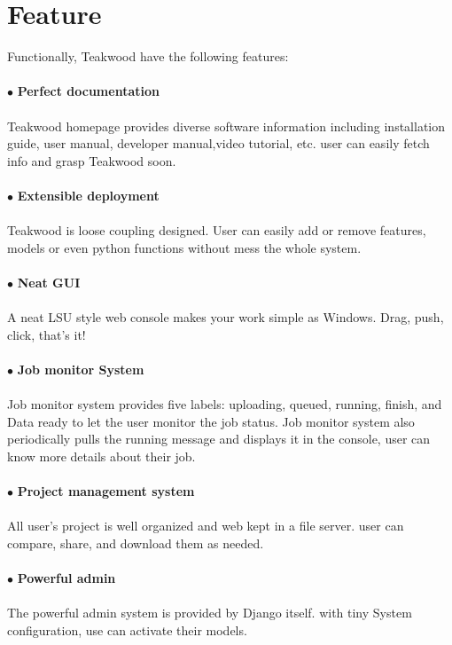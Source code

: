 \section{Feature}
Functionally, Teakwood have the following features:\\
\\
$\bullet$ \textbf{Perfect documentation}\\
\\
Teakwood homepage provides diverse software information including installation guide, user manual, developer manual,video tutorial, etc. user can easily fetch info and grasp Teakwood soon.\\
\\
$\bullet$ \textbf{Extensible deployment}\\
\\
Teakwood is loose coupling designed. User can easily add or remove features, models or even python functions without mess the whole system.\\
\\
$\bullet$ \textbf{Neat GUI}\\
\\
A neat LSU style web console makes your work simple as Windows. Drag, push, click, that's it!\\
\\
$\bullet$ \textbf{Job monitor System}\\
\\
Job monitor system provides five labels: uploading, queued, running, finish, and Data ready to let the user monitor the job status. Job monitor system also periodically pulls the running message and displays it in the console, user can know more details about their job.\\
\\
$\bullet$ \textbf{Project management system}\\
\\
All user's project is well organized and web kept in a file server. user can compare, share, and download them as needed.\\
\\
$\bullet$ \textbf{Powerful admin}\\
\\
The powerful admin system is provided by Django itself. with tiny System configuration, use can activate their models.



